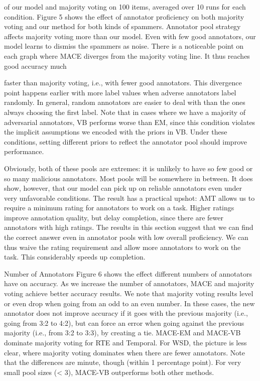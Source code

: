 \documentclass[
]{article}
\begin{document}
of our model and majority voting on 100 items, averaged over 10 runs for
each condition. Figure 5 shows the effect of annotator proficiency on
both majority voting and our method for both kinds of spammers.
Annotator pool strategy affects majority voting more than our model.
Even with few good annotators, our model learns to dismiss the spammers
as noise. There is a noticeable point on each graph where MACE diverges
from the majority voting line. It thus reaches good accuracy much

faster than majority voting, i.e., with fewer good annotators. This
divergence point happens earlier with more label values when adverse
annotators label randomly. In general, random annotators are easier to
deal with than the ones always choosing the first label. Note that in
cases where we have a majority of adversarial annotators, VB performs
worse than EM, since this condition violates the implicit assumptions we
encoded with the priors in VB. Under these conditions, setting different
priors to reflect the annotator pool should improve performance.

Obviously, both of these pools are extremes: it is unlikely to have so
few good or so many malicious annotators. Most pools will be somewhere
in between. It does show, however, that our model can pick up on
reliable annotators even under very unfavorable conditions. The result
has a practical upshot: AMT allows us to require a minimum rating for
annotators to work on a task. Higher ratings improve annotation quality,
but delay completion, since there are fewer annotators with high
ratings. The results in this section suggest that we can find the
correct answer even in annotator pools with low overall proficiency. We
can thus waive the rating requirement and allow more annotators to work
on the task. This considerably speeds up completion.

Number of Annotators Figure 6 shows the effect different numbers of
annotators have on accuracy. As we increase the number of annotators,
MACE and majority voting achieve better accuracy results. We note that
majority voting results level or even drop when going from an odd to an
even number. In these cases, the new annotator does not improve accuracy
if it goes with the previous majority (i.e., going from 3:2 to 4:2), but
can force an error when going against the previous majority (i.e., from
3:2 to 3:3), by creating a tie. MACE-EM and MACE-VB dominate majority
voting for RTE and Temporal. For WSD, the picture is less clear, where
majority voting dominates when there are fewer annotators. Note that the
differences are minute, though (within 1 percentage point). For very
small pool sizes (\textless{} 3), MACE-VB outperforms both other
methods.
\end{document}
